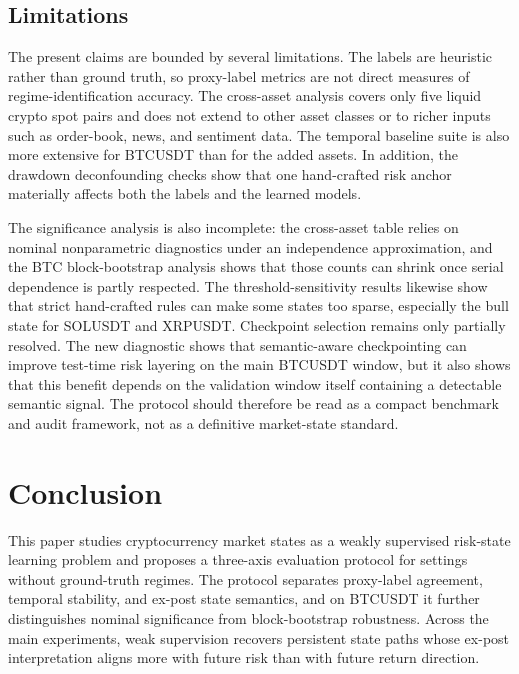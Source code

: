 \documentclass[a4paper,fleqn]{cas-dc}
\begin{document}
\subsection{Limitations}
The present claims are bounded by several limitations. The labels are heuristic rather than ground truth, so proxy-label metrics are not direct measures of regime-identification accuracy. The cross-asset analysis covers only five liquid crypto spot pairs and does not extend to other asset classes or to richer inputs such as order-book, news, and sentiment data. The temporal baseline suite is also more extensive for BTCUSDT than for the added assets. In addition, the drawdown deconfounding checks show that one hand-crafted risk anchor materially affects both the labels and the learned models.

The significance analysis is also incomplete: the cross-asset table relies on nominal nonparametric diagnostics under an independence approximation, and the BTC block-bootstrap analysis shows that those counts can shrink once serial dependence is partly respected. The threshold-sensitivity results likewise show that strict hand-crafted rules can make some states too sparse, especially the bull state for SOLUSDT and XRPUSDT. Checkpoint selection remains only partially resolved. The new diagnostic shows that semantic-aware checkpointing can improve test-time risk layering on the main BTCUSDT window, but it also shows that this benefit depends on the validation window itself containing a detectable semantic signal. The protocol should therefore be read as a compact benchmark and audit framework, not as a definitive market-state standard.

\section{Conclusion}
This paper studies cryptocurrency market states as a weakly supervised risk-state learning problem and proposes a three-axis evaluation protocol for settings without ground-truth regimes. The protocol separates proxy-label agreement, temporal stability, and ex-post state semantics, and on BTCUSDT it further distinguishes nominal significance from block-bootstrap robustness. Across the main experiments, weak supervision recovers persistent state paths whose ex-post interpretation aligns more with future risk than with future return direction.
\end{document}
